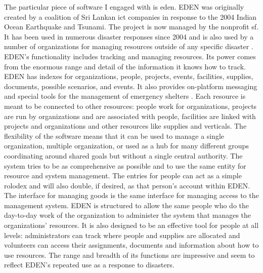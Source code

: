\documentclass[a4paper,man,natbib,floatsintext]{apa6}
\begin{document}
   The particular piece of software I engaged with is \acrfull{eden}. \gls{EDEN} was originally created by a coalition of Sri Lankan \acrfull{ict} companies in response to the 2004 Indian Ocean Earthquake and Tsunami. The project is now managed by the nonprofit \gls{sf}. It has been used in numerous disaster responses since 2004 and is also used by a number of organizations for managing resources outside of any specific disaster \citep{Sahana_Foundation_undated-hl}. \gls{EDEN}'s functionality includes tracking and managing resources. Its power comes from the enormous range and detail of the information it knows how to track. \gls{EDEN} has indexes for organizations, people, projects, events, facilities, supplies, documents, possible scenarios, and events. It also provides on-platform messaging and special tools for the management of emergency shelters \citep{Sahana_Foundation2011-od}. Each resource is meant to be connected to other resources: people work for organizations, projects are run by organizations and are associated with people, facilities are linked with projects and organizations and other resources like supplies and verticals. The flexibility of the software means that it can be used to manage a single organization, multiple organization, or used as a hub for many different groups coordinating around shared goals but without a single central authority. The system tries to be as comprehensive as possible and to use the same entity for resource and system management. The entries for people can act as a simple rolodex and will also double, if desired, as that person's account within \gls{EDEN}. The interface for managing goods is the same interface for managing access to the management system. \gls{EDEN} is structured to allow the same people who do the day-to-day work of the organization to administer the system that manages the organizations' resources. It is also designed to be an effective tool for people at all levels: administrators can track where people and supplies are allocated and volunteers can access their assignments, documents and information about how to use resources. The range and breadth of its functions are impressive and seem to reflect \gls{EDEN}'s repeated use as a response to disasters.
\end{document}
